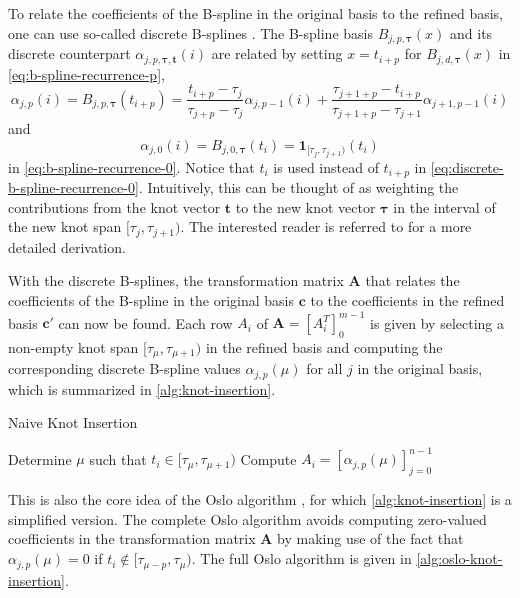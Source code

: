 To relate the coefficients of the B-spline in the original basis to the refined basis, one can use so-called discrete B-splines \citep{Cohen1980}.  The B-spline basis $B_{j, p, \boldsymbol{\tau}}(x)$ and its discrete counterpart $\alpha_{j,p, \boldsymbol{\tau}, \mathbf t}(i)$ are related by setting $x = t_{i+p}$ for $B_{j, d, \boldsymbol{\tau}}(x)$ in \cref{eq:b-spline-recurrence-p}, 
\begin{equation}\label{eq:discrete-b-spline-recurrence-p}
    \alpha_{j,p}(i) = B_{j, p, \boldsymbol{\tau}}(t_{i+p}) = 
    \frac{t_{i+p}-\tau_j}{\tau_{j+p}-\tau_j} \alpha_{j,p-1}(i) + \frac{\tau_{j+1+p}-t_{i+p}}{\tau_{j+1+p}-\tau_{j+1}} \alpha_{j+1,p-1}(i)
\end{equation}
and 
\begin{equation}\label{eq:discrete-b-spline-recurrence-0}
\alpha_{j,0}(i) = B_{j, 0, \boldsymbol{\tau}}(t_{i}) = \mathbf 1_{[\tau_j, \tau_{j+1})}(t_{i})
\end{equation}
 in \cref{eq:b-spline-recurrence-0}. Notice that $t_i$ is used instead of $t_{i+p}$ in \cref{eq:discrete-b-spline-recurrence-0}. Intuitively, this can be thought of as weighting the contributions from the knot vector $\mathbf t$ to the new knot vector $\boldsymbol \tau$ in the interval of the new knot span $[\tau_j, \tau_{j+1})$. The interested reader is referred to \cite{bspline-uio} for a more detailed derivation.

With the discrete B-splines, the transformation matrix $\mathbf A$ that relates the coefficients of the B-spline in the original basis $\mathbf c$ to the coefficients in the refined basis $\mathbf c'$ can now be found. Each row $A_i$ of $\mathbf A = [A_i^T]_0^{m-1}$ is given by selecting a non-empty knot span $[\tau_\mu, \tau_{\mu+1})$ in the refined basis and computing the corresponding discrete B-spline values $\alpha_{j,p}(\mu)$ for all $j$ in the original basis, which is summarized in \cref{alg:knot-insertion}.

\begin{algorithm}
    \caption{Naive Knot Insertion}\label{alg:knot-insertion}
    \begin{algorithmic}
        \State Determine $\mu$ such that $t_i \in [\tau_\mu, \tau_{\mu+1})$
        \State Compute $A_i = [\alpha_{j,p}(\mu)]_{j=0}^{n-1}$
        \EndFor
    \end{algorithmic}
\end{algorithm}

This is also the core idea of the Oslo algorithm \citep{Cohen1980}, for which \cref{alg:knot-insertion} is a simplified version. The complete Oslo algorithm avoids computing zero-valued coefficients in the transformation matrix $\mathbf A$ by making use of the fact that $\alpha_{j,p}(\mu) = 0$ if $t_i \notin [\tau_{\mu-p}, \tau_{\mu})$. The full Oslo algorithm is given in \cref{alg:oslo-knot-insertion}.

